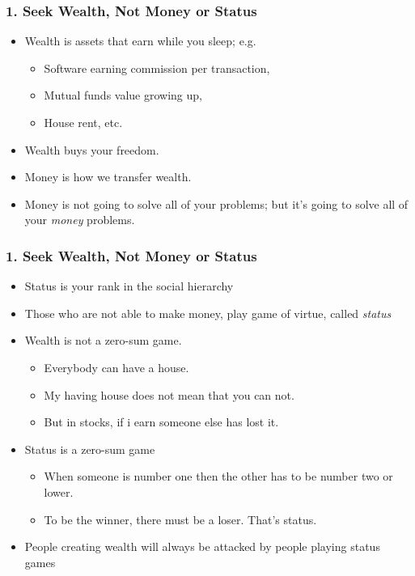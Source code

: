\begin{frame}[fragile]
\frametitle{1. Seek Wealth, Not Money or Status}
\begin{itemize}
\item Wealth is assets that earn while you sleep; e.g.
\begin{itemize}
\item Software earning commission per transaction, 
\item Mutual funds value growing up, 
\item House rent, etc.
\end{itemize}
\item Wealth buys your freedom.
\item Money is how we transfer wealth.
\item Money is not going to solve all of your problems; but it's going to solve all of your {\it money} problems.
\end{itemize}
\end{frame}


\begin{frame}[fragile]
\frametitle{1. Seek Wealth, Not Money or Status}
\begin{itemize}
\item Status is your rank in the social hierarchy
\item Those who are not able to make money, play game of virtue, called {\it status}
\item Wealth is not a zero-sum game. 
\begin{itemize}
\item Everybody can have a house. 
\item My having house does not mean that you can not. 
\item But in stocks, if i earn someone else has lost it.
\end{itemize}
\item Status is a zero-sum game
\begin{itemize}
\item When someone is number one then the other has to be number two or lower. 
\item  To be the winner, there must be a loser. That's status.
\end{itemize}
\item People creating wealth will always be attacked by people playing status games
\end{itemize}
\end{frame}

